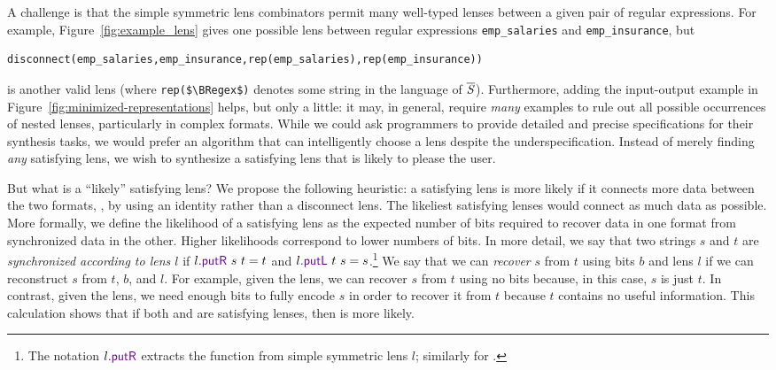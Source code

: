 \documentclass[acmsmall,screen,anonymous]{acmart}
\begin{document}
A challenge is that the simple symmetric lens combinators permit many
well-typed lenses
between a given pair of regular expressions. For example, 
Figure~\ref{fig:example_lens} gives one possible lens between regular
expressions  \lstinline{emp_salaries} and \lstinline{emp_insurance},
but 
%
\begin{lstlisting}
disconnect(emp_salaries,emp_insurance,rep(emp_salaries),rep(emp_insurance))
\end{lstlisting}
%
is another valid lens (where \lstinline{rep($\BRegex$)} denotes some string in the
language of $\overline{\mathit{S}}$). Furthermore, adding the input-output example in
Figure~\ref{fig:minimized-representations} 
helps, but only a little: it may, in general, require {\em many} examples to rule
out all possible occurrences of nested \Disconnect lenses,
particularly in complex formats. 
While we could ask programmers to provide detailed and precise specifications
for their synthesis tasks, we would prefer an algorithm that can intelligently
choose a lens despite the underspecification. Instead of merely finding
\emph{any} satisfying lens, we wish to synthesize a satisfying lens that is
likely to please the user.

But what is a ``likely'' satisfying lens? We propose the following
heuristic: a satisfying
lens is more likely if it connects more data between the two
formats, \EG, by using an identity rather than a disconnect lens.  The
likeliest satisfying lenses would connect as much data as
possible. More formally, we define the likelihood of a
satisfying lens as the expected number of bits required to recover
data in one format from synchronized data in the other.  Higher
likelihoods correspond to lower numbers of bits. In more
detail, we say that two strings $s$ and $t$ are \emph{synchronized
according to lens $l$} if $l.\PutR\ s\ t = t$ and $l.\PutL\ t\ s = s$.\footnote{
The notation $l.\PutR$ extracts the \PutR function from simple
symmetric lens $l$; similarly for \PutL.}  We say that we
can \emph{recover} $s$ from $t$ using bits $b$ and lens $l$ if we can
reconstruct $s$ from $t$, $b$, and $l$.  For example, given
the \IdentityLens{} lens, we can recover $s$ from $t$ using no bits
because, in this case, $s$ is just $t$.  In contrast, given
the \Disconnect{} lens, we need enough bits to fully encode $s$ in
order to recover it from $t$ because $t$ contains no useful
information.  This calculation shows that if both \IdentityLens{}
and \Disconnect{} are satisfying lenses, then \IdentityLens{} is more
likely.
\end{document}
